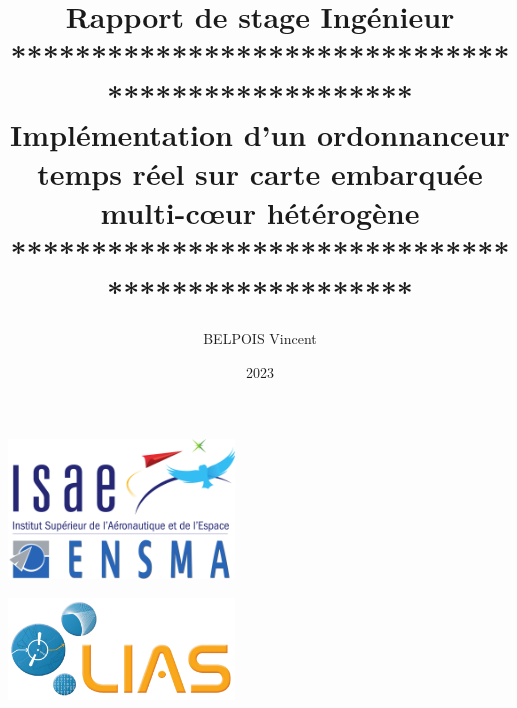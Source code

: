\documentclass{article}
\title{Rapport de stage Ingénieur\vspace{10pt}\\**************************************************\\Implémentation d'un ordonnanceur temps réel sur
carte embarquée multi-cœur hétérogène\vspace{10pt} \\**************************************************}
\author{BELPOIS Vincent}
\begin{document}
\date{2023}
\maketitle
\thispagestyle{empty}

\vspace{10mm}

    \begin{center}
    \includegraphics[width = 6cm]{Images/logo_ensma.png}
    \end{center}
    \vspace{2cm}
    \begin{center}
        \includegraphics[width = 6cm]{Images/logo_LIAS.png}
    \end{center}
    \newpage
    \thispagestyle{empty}
    \mbox{}
    
    

    
\end{document}
